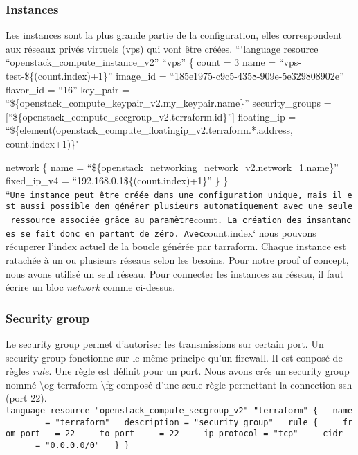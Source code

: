 \documentclass[]{article}
\begin{document}
\subsubsection{Instances}\label{instances}

Les instances sont la plus grande partie de la configuration, elles
correspondent aux réseaux privés virtuels (vps) qui vont être créées.
```language resource ``openstack\_compute\_instance\_v2'' ``vps'' \{
count = 3 name = ``vps-test-\$\{(count.index)+1\}'' image\_id =
``185e1975-c9c5-4358-909e-5e329808902e'' flavor\_id = ``16'' key\_pair =
``\$\{openstack\_compute\_keypair\_v2.my\_keypair.name\}''
security\_groups =
{[}``\$\{openstack\_compute\_secgroup\_v2.terraform.id\}''{]}
floating\_ip =
``\$\{element(openstack\_compute\_floatingip\_v2.terraform.*.address,
count.index+1)\}"

network \{ name =
``\$\{openstack\_networking\_network\_v2.network\_1.name\}''
fixed\_ip\_v4 = ``192.168.0.1\$\{(count.index)+1\}'' \} \}
``\texttt{Une\ instance\ peut\ être\ créée\ dans\ une\ configuration\ unique,\ mais\ il\ est\ aussi\ possible\ d\textquotesingle{}en\ générer\ plusieurs\ automatiquement\ avec\ une\ seule\ ressource\ associée\ grâce\ au\ paramètre}count\texttt{.\ La\ création\ des\ insantances\ se\ fait\ donc\ en\ partant\ de\ zéro.\ Avec}count.index`
nous pouvons récuperer l'index actuel de la boucle générée par
tarraform. Chaque instance est ratachée à un ou plusieurs réseaus selon
les besoins. Pour notre proof of concept, nous avons utilisé un seul
réseau. Pour connecter les instances au réseau, il faut écrire un bloc
\emph{network} comme ci-dessus.

\subsubsection{Security group}\label{security-group}

Le security group permet d'autoriser les transmissions sur certain port.
Un security group fonctionne sur le même principe qu'un firewall. Il est
conposé de règles \emph{rule}. Une règle est définit pour un port. Nous
avons crés un security group nommé \textbackslash{}og terraform
\textbackslash{}fg composé d'une seule règle permettant la connection
ssh (port 22).
\texttt{language\ resource\ "openstack\_compute\_secgroup\_v2"\ "terraform"\ \{\ \ \ name\ \ \ \ \ \ \ \ =\ "terraform"\ \ \ description\ =\ "security\ group"\ \ \ rule\ \{\ \ \ \ \ from\_port\ \ \ =\ 22\ \ \ \ \ to\_port\ \ \ \ \ =\ 22\ \ \ \ \ ip\_protocol\ =\ "tcp"\ \ \ \ \ cidr\ \ \ \ \ \ \ \ =\ "0.0.0.0/0"\ \ \ \}\ \}}
\end{document}
